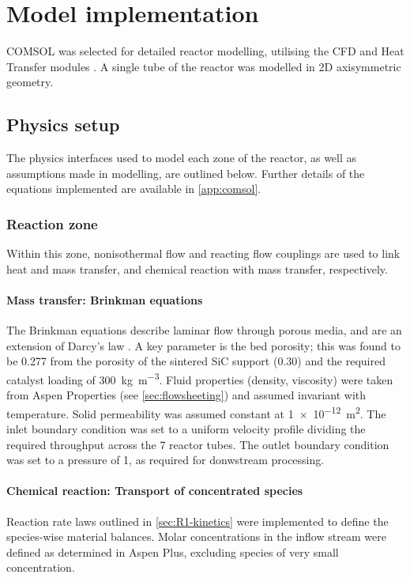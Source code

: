 \section{Model implementation}

COMSOL was selected for detailed reactor modelling, utilising the CFD and Heat Transfer modules \cite{comsol_comsol_2020,comsol_cfd_2020,comsol_heat_2020}. A single tube of the reactor was modelled in 2D axisymmetric geometry.

\subsection{Physics setup}
The physics interfaces used to model each zone of the reactor, as well as assumptions made in modelling, are outlined below. Further details of the equations implemented are available in \cref{app:comsol}.

\subsubsection{Reaction zone}

Within this zone, nonisothermal flow and reacting flow couplings are used to link heat and mass transfer, and chemical reaction with mass transfer, respectively.

\paragraph{Mass transfer: Brinkman equations}
The Brinkman equations describe laminar flow through porous media, and are an extension of Darcy's law \cite{comsol_cfd_2020}. A key parameter is the bed porosity; this was found to be \num{0.277} from the porosity of the sintered SiC support (0.30) and the required catalyst loading of \SI{300}{\kg\per\cubic\m}. Fluid properties (density, viscosity) were taken from Aspen Properties (see \cref{sec:flowsheeting}) and assumed invariant with temperature. Solid permeability was assumed constant at \SI{1e-12}{\square\m}. The inlet boundary condition was set to a uniform velocity profile dividing the required throughput across the 7 reactor tubes. The outlet boundary condition was set to a pressure of \SI{1}{\atm}, as required for donwstream processing.

\paragraph{Chemical reaction: Transport of concentrated species}
Reaction rate laws outlined in \cref{sec:R1-kinetics} were implemented to define the species-wise material balances. Molar concentrations in the inflow stream were defined as determined in Aspen Plus, excluding species of very small concentration.

